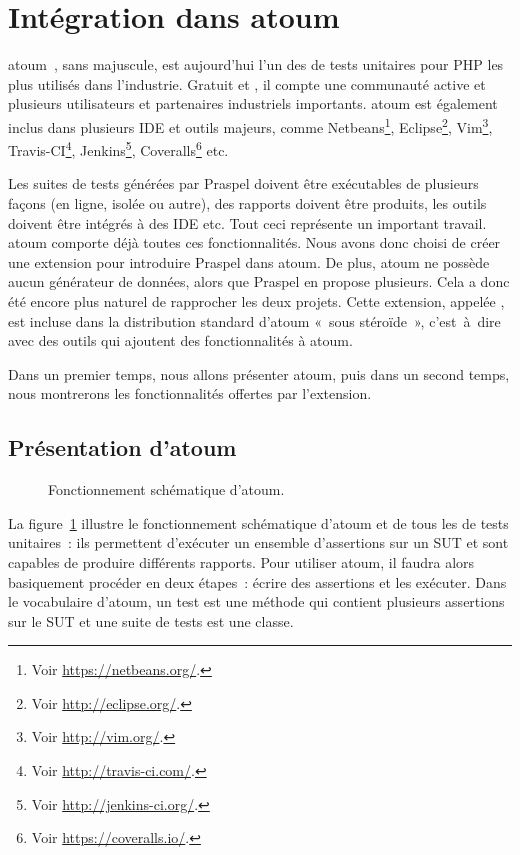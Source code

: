 \section{Intégration dans atoum}
\label{section:tools:atoum}

atoum~, sans majuscule, est aujourd'hui l'un des
 de tests unitaires pour PHP les plus utilisés dans
l'industrie. Gratuit et , il compte une communauté
active et plusieurs utilisateurs et partenaires industriels importants. atoum
est également inclus dans plusieurs IDE et outils majeurs, comme
Netbeans\footnote{Voir \url{https://netbeans.org/}.}, Eclipse\footnote{Voir
\url{http://eclipse.org/}.}, Vim\footnote{Voir \url{http://vim.org/}.},
Travis-CI\footnote{Voir \url{http://travis-ci.com/}.}, Jenkins\footnote{Voir
\url{http://jenkins-ci.org/}.}, Coveralls\footnote{Voir
\url{https://coveralls.io/}.} etc.

Les suites de tests générées par Praspel doivent être exécutables de plusieurs
façons (en ligne, isolée ou autre), des rapports doivent être produits, les
outils doivent être intégrés à des IDE etc. Tout ceci représente un important
travail. atoum comporte déjà toutes ces fonctionnalités. Nous avons donc choisi
de créer une extension pour introduire Praspel dans atoum. De plus, atoum ne
possède aucun générateur de données, alors que Praspel en propose plusieurs.
Cela a donc été encore plus naturel de rapprocher les deux projets. Cette
extension, appelée , est incluse dans la
distribution standard d'atoum «~sous stéroïde~», c'est~à~dire avec des outils
qui ajoutent des fonctionnalités à atoum.

Dans un premier temps, nous allons présenter atoum, puis dans un second temps,
nous montrerons les fonctionnalités offertes par l'extension.

\subsection{Présentation d'atoum}

\begin{figure}


\caption{\label{figure:tools:atoum} Fonctionnement schématique d'atoum.}

\end{figure}

La figure~\ref{figure:tools:atoum} illustre le fonctionnement schématique
d'atoum et de tous les  de tests unitaires~: ils permettent
d'exécuter un ensemble d'assertions sur un SUT et sont capables de produire
différents rapports. Pour utiliser atoum, il faudra alors basiquement procéder
en deux étapes~: écrire des assertions et les exécuter. Dans le vocabulaire
d'atoum, un test est une méthode qui contient plusieurs assertions sur le SUT et
une suite de tests est une classe.

